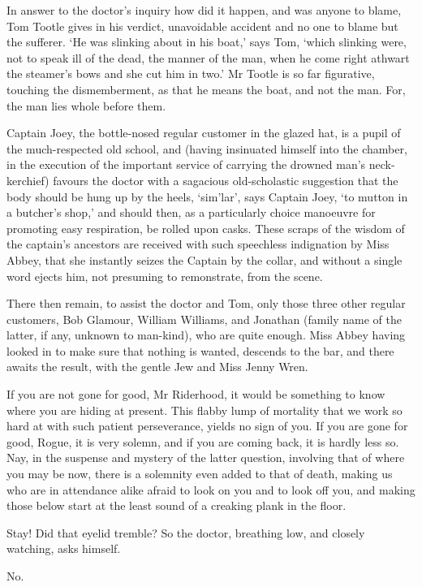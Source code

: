 In answer to the doctor’s inquiry how did it happen, and was anyone to
blame, Tom Tootle gives in his verdict, unavoidable accident and no one
to blame but the sufferer. ‘He was slinking about in his boat,’ says
Tom, ‘which slinking were, not to speak ill of the dead, the manner of
the man, when he come right athwart the steamer’s bows and she cut him
in two.’ Mr Tootle is so far figurative, touching the dismemberment, as
that he means the boat, and not the man. For, the man lies whole before
them.

Captain Joey, the bottle-nosed regular customer in the glazed hat, is a
pupil of the much-respected old school, and (having insinuated himself
into the chamber, in the execution of the important service of carrying
the drowned man’s neck-kerchief) favours the doctor with a sagacious
old-scholastic suggestion that the body should be hung up by the heels,
‘sim’lar’, says Captain Joey, ‘to mutton in a butcher’s shop,’ and
should then, as a particularly choice manoeuvre for promoting easy
respiration, be rolled upon casks. These scraps of the wisdom of the
captain’s ancestors are received with such speechless indignation by
Miss Abbey, that she instantly seizes the Captain by the collar, and
without a single word ejects him, not presuming to remonstrate, from the
scene.

There then remain, to assist the doctor and Tom, only those three other
regular customers, Bob Glamour, William Williams, and Jonathan (family
name of the latter, if any, unknown to man-kind), who are quite enough.
Miss Abbey having looked in to make sure that nothing is wanted,
descends to the bar, and there awaits the result, with the gentle Jew
and Miss Jenny Wren.

If you are not gone for good, Mr Riderhood, it would be something to
know where you are hiding at present. This flabby lump of mortality that
we work so hard at with such patient perseverance, yields no sign of
you. If you are gone for good, Rogue, it is very solemn, and if you are
coming back, it is hardly less so. Nay, in the suspense and mystery of
the latter question, involving that of where you may be now, there is a
solemnity even added to that of death, making us who are in attendance
alike afraid to look on you and to look off you, and making those below
start at the least sound of a creaking plank in the floor.

Stay! Did that eyelid tremble? So the doctor, breathing low, and closely
watching, asks himself.

No.

